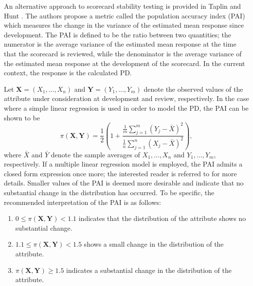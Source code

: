 \documentclass{article}
\theoremstyle{def}
\begin{document}
An alternative approach to scorecard stability testing is provided in Taplin and Hunt \cite{TAPLINHUNT2019}. The authors propose a metric called the population accuracy index (PAI) which measures the change in the variance of the estimated mean response since development. The PAI is defined to be the ratio between two quantities; the numerator is the average variance of the estimated mean response at the time that the scorecard is reviewed, while the denominator is the average variance of the estimated mean response at the development of the scorecard. In the current context, the response is the calculated PD.

Let $\mathbf{X}=(X_1,\dots,X_n)$ and $\mathbf{Y}=(Y_1,\dots,Y_m)$ denote the observed values of the attribute under consideration at development and review, respectively. In the case where a simple linear regression is used in order to model the PD, the PAI can be shown to be
\begin{equation}
        \pi(\mathbf{X},\mathbf{Y}) = \frac{1}{2} \left(1+\frac{\frac{1}{m}\sum_{j=1}^m(Y_j-\bar{X} )^2 }{\frac{1}{n}\sum_{j=1}^n(X_j-\bar{X} )^2}\right), \label{THF}
\end{equation}
where $\bar{X}$ and $\bar{Y}$ denote the sample averages of $X_1,\dots,X_n$ and $Y_1,\dots,Y_m$, respectively. If a multiple linear regression model is employed, the PAI admits a closed form expression once more; the interested reader is referred to \cite{TAPLINHUNT2019} for more details. Smaller values of the PAI is deemed more desirable and indicate that no substantial change in the distribution has occurred. To be specific, the recommended interpretation of the PAI is as follows:
\begin{enumerate}
    \item $0 \leq \pi(\mathbf{X},\mathbf{Y}) < 1.1$ indicates that the distribution of the attribute shows no substantial change.
    \item $1.1 \leq \pi(\mathbf{X},\mathbf{Y}) < 1.5$ shows a small change in the distribution of the attribute.
    \item $\pi(\mathbf{X},\mathbf{Y}) \geq 1.5$ indicates a substantial change in the distribution of the attribute.
\end{enumerate}
\end{document}
